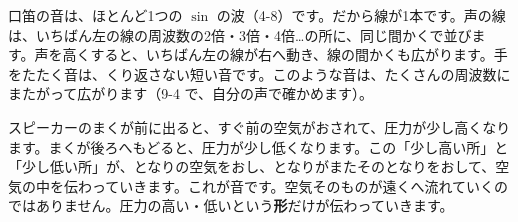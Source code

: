 口笛の音は、ほとんど1つの $\sin$ の波（4-8）です。だから線が1本です。声の線は、いちばん左の線の周波数の2倍・3倍・4倍…の所に、同じ間かくで並びます。声を高くすると、いちばん左の線が右へ動き、線の間かくも広がります。手をたたく音は、くり返さない短い音です。このような音は、たくさんの周波数にまたがって広がります（9-4 で、自分の声で確かめます）。

\begin{omoidasou}
\end{omoidasou}



\label{bk:9-0:oto}スピーカーのまくが前に出ると、すぐ前の空気がおされて、圧力が少し高くなります。まくが後ろへもどると、圧力が少し低くなります。この「少し高い所」と「少し低い所」が、となりの空気をおし、となりがまたそのとなりをおして、空気の中を伝わっていきます。これが音です。空気そのものが遠くへ流れていくのではありません。圧力の高い・低いという\textbf{形}だけが伝わっていきます。


